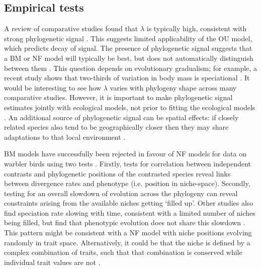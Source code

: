 \documentclass[12pt]{article}
\begin{document}
\subsection{Empirical tests}

A review of comparative studies found that $\lambda$ is typically high, consistent with strong phylogenetic signal \citep{freckleton_phylogenetic_2002}. This suggests limited applicability of the OU model, which predicts decay of signal. The presence of phylogenetic signal suggests that a BM or NF model will typically be best, but does not automatically distinguish between them \citep{cooper_phylogenetic_2010}. This question depends on evolutionary gradualism; for example, a recent study shows that two-thirds of variation in body mass is speciational \citep{Mattila&Bokma 2008}. It would be interesting to see how $\lambda$ varies with phylogeny shape across many comparative studies. However, it is important to make phylogenetic signal estimates jointly with ecological models, not prior to fitting the ecological models \citep{hansen_assessing_2005}. An additional source of phylogenetic signal can be spatial effects: if closely related species also tend to be geographically closer then they may share adaptations to that local environment \citep{garland_phylogenetic_2005}.

BM models have successfully been rejected in favour of NF models for data on warbler birds using two tests \citep{freckleton_detecting_2006}. Firstly, tests for correlation between independent contrasts \citep{felsenstein_phylogenies_1985} and phylogenetic positions of the contrasted species reveal links between divergence rates and phenotype (i.e. position in niche-space). Secondly, testing for an overall slowdown of evolution across the phylogeny can reveal constraints arising from the available niches getting `filled up'. Other studies also find speciation rate slowing with time, consistent with a limited number of niches being filled, but find that phenotypic evolution does not share this slowdown \citep{burbrink_evidence_2012}. This pattern might be consistent with a NF model with niche positions evolving randomly in trait space. Alternatively, it could be that the niche is defined by a complex combination of traits, such that that combination is conserved while individual trait values are not \citep{crisp_phylogenetic_2012}.
\end{document}
